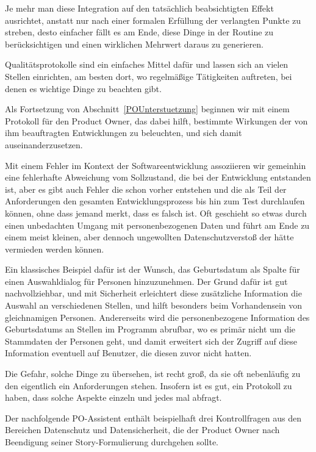 Je mehr man diese Integration auf den tatsächlich beabsichtigten Effekt ausrichtet, anstatt nur nach einer formalen Erfüllung der verlangten Punkte zu streben, desto einfacher fällt es am Ende, diese Dinge in der Routine zu berücksichtigen und einen wirklichen Mehrwert daraus zu generieren.

Qualitätsprotokolle sind ein einfaches Mittel dafür und lassen sich an vielen Stellen einrichten, am besten dort, wo regelmäßige Tätigkeiten auftreten, bei denen es wichtige Dinge zu beachten gibt.

Als Fortsetzung von Abschnitt~\ref{POUnterstuetzung} beginnen wir mit einem Protokoll für den Product Owner, das dabei hilft, bestimmte Wirkungen der von ihm beauftragten Entwicklungen zu beleuchten, und sich damit auseinanderzusetzen.

Mit einem Fehler im Kontext der Softwareentwicklung assoziieren wir gemeinhin eine fehlerhafte Abweichung vom Sollzustand, die bei der Entwicklung entstanden ist, aber es gibt auch Fehler die schon vorher entstehen und die als Teil der Anforderungen den gesamten Entwicklungsprozess bis hin zum Test durchlaufen können, ohne dass jemand merkt, dass es falsch ist. Oft geschieht so etwas durch einen unbedachten Umgang mit personenbezogenen Daten und führt am Ende zu einem meist kleinen, aber dennoch ungewollten Datenschutzverstoß der hätte vermieden werden können.

Ein klassisches Beispiel dafür ist der Wunsch, das Geburtsdatum als Spalte für einen Auswahldialog für Personen hinzuzunehmen. Der Grund dafür ist gut nachvollziehbar, und mit Sicherheit erleichtert diese zusätzliche Information die Auswahl an verschiedenen Stellen, und hilft besonders beim Vorhandensein von gleichnamigen Personen. Andererseits wird die personenbezogene Information des Geburtsdatums an Stellen im Programm abrufbar, wo es primär nicht um die Stammdaten der Personen geht, und damit erweitert sich der Zugriff auf diese Information eventuell auf Benutzer, die diesen zuvor nicht hatten.

Die Gefahr, solche Dinge zu übersehen, ist recht groß, da sie oft nebenläufig zu den eigentlich ein Anforderungen stehen. Insofern ist es gut, ein Protokoll zu haben, dass solche Aspekte einzeln und jedes mal abfragt.

Der nachfolgende PO-Assistent enthält beispielhaft drei Kontrollfragen aus den Bereichen Datenschutz und Datensicherheit, die der Product Owner nach Beendigung seiner Story-Formulierung durchgehen sollte.

